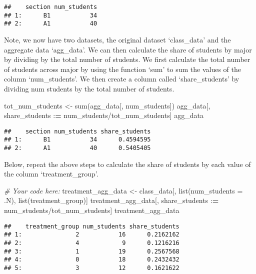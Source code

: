\documentclass[
]{article}
\newenvironment{Shaded}{\begin{snugshade}}{\end{snugshade}}
\newcommand{\AttributeTok}[1]{\textcolor[rgb]{0.77,0.63,0.00}{#1}}
\newcommand{\CommentTok}[1]{\textcolor[rgb]{0.56,0.35,0.01}{\textit{#1}}}
\newcommand{\ErrorTok}[1]{\textcolor[rgb]{0.64,0.00,0.00}{\textbf{#1}}}
\newcommand{\FunctionTok}[1]{\textcolor[rgb]{0.00,0.00,0.00}{#1}}
\newcommand{\NormalTok}[1]{#1}
\newcommand{\OtherTok}[1]{\textcolor[rgb]{0.56,0.35,0.01}{#1}}
\newcommand{\SpecialCharTok}[1]{\textcolor[rgb]{0.00,0.00,0.00}{#1}}
\begin{document}
\begin{verbatim}
##    section num_students
## 1:      B1           34
## 2:      A1           40
\end{verbatim}

Note, we now have two datasets, the original dataset `class\_data' and
the aggregate data `agg\_data'. We can then calculate the share of
students by major by dividing by the total number of students. We first
calculate the total number of students across major by using the
function `sum' to sum the values of the column `num\_students'. We then
create a column called `share\_students' by dividing num students by the
total number of students.

\begin{Shaded}
\begin{Highlighting}[]
\NormalTok{tot\_num\_students }\OtherTok{\textless{}{-}} \FunctionTok{sum}\NormalTok{(agg\_data[, num\_students])}
\NormalTok{agg\_data[, share\_students }\SpecialCharTok{:}\ErrorTok{=}\NormalTok{ num\_students}\SpecialCharTok{/}\NormalTok{tot\_num\_students]}
\NormalTok{agg\_data}
\end{Highlighting}
\end{Shaded}

\begin{verbatim}
##    section num_students share_students
## 1:      B1           34      0.4594595
## 2:      A1           40      0.5405405
\end{verbatim}

Below, repeat the above steps to calculate the share of students by each
value of the column `treatment\_group'.

\begin{Shaded}
\begin{Highlighting}[]
\CommentTok{\# Your code here:}
\NormalTok{treatment\_agg\_data }\OtherTok{\textless{}{-}}\NormalTok{ class\_data[, }\FunctionTok{list}\NormalTok{(}\AttributeTok{num\_students =}\NormalTok{ .N), }\FunctionTok{list}\NormalTok{(treatment\_group)]}
\NormalTok{treatment\_agg\_data[, share\_students }\SpecialCharTok{:}\ErrorTok{=}\NormalTok{ num\_students}\SpecialCharTok{/}\NormalTok{tot\_num\_students]}
\NormalTok{treatment\_agg\_data}
\end{Highlighting}
\end{Shaded}

\begin{verbatim}
##    treatment_group num_students share_students
## 1:               2           16      0.2162162
## 2:               4            9      0.1216216
## 3:               1           19      0.2567568
## 4:               0           18      0.2432432
## 5:               3           12      0.1621622
\end{verbatim}
\end{document}

